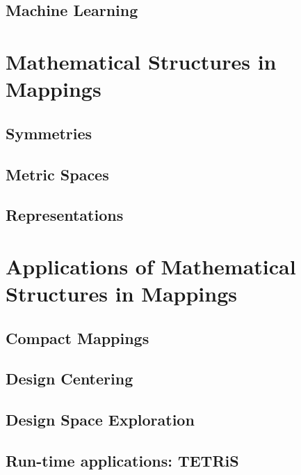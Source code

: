 \documentclass{report}
\begin{document}
\section{Machine Learning}


\chapter{Mathematical Structures in Mappings}

\section{Symmetries}
\section{Metric Spaces}
\section{Representations}
%

\chapter{Applications of Mathematical Structures in Mappings}
\label{chap:mapping_applications}

\section{Compact Mappings}
\section{Design Centering}
\section{Design Space Exploration}

%
\section{Run-time applications: TETRiS}
\end{document}
